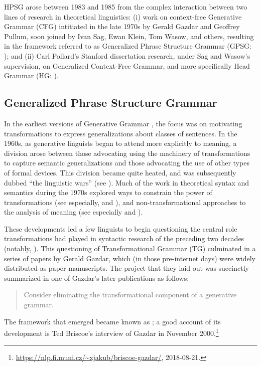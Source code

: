 \documentclass[output=paper]{langsci/langscibook}
\begin{document}
HPSG arose between 1983 and 1985 from the complex interaction between two lines of research in theoretical linguistics: (i) work on context-free Generative Grammar (CFG) intitiated in the late 1970s by Gerald Gazdar and Geoffrey Pullum, soon joined by Ivan Sag, Ewan Klein, Tom Wasow, and others, resulting in the framework referred to as Generalized Phrase Structure Grammar (GPSG: \citet*{GKPS85a}); and (ii) Carl Pollard's Stanford dissertation research, under Sag and Wasow's supervision, on Generalized Context-Free Grammar, and more specifically Head Grammar (HG: \citet{Pollard84a-u}).

\subsection{Generalized Phrase Structure Grammar}

In the earliest versions of Generative Grammar \citep{Chomsky57a}, the focus was on motivating transformations to express generalizations about classes of sentences.  In the 1960s, as generative linguists began to attend more explicitly to meaning, a division arose between those advocating using the machinery of transformations to capture semantic generalizations and those advocating the use of other types of formal devices.  This division became quite heated, and was subsequently dubbed ``the linguistic wars'' (see \citet[Chapter 5]{Newmeyer:1980}).  Much of the work in theoretical syntax and semantics during the 1970s explored ways to constrain the power of transformations (see especially, \citet{Chomsky73a} and \citet{ChomLas1977}), and non-transformational approaches to the analysis of meaning (see especially \citet{Montague74a-ed} and \citet{Dowty79a}).

These developments led a few linguists to begin questioning the central role transformations had played in syntactic research of the preceding two decades (notably, \citet{Bresnan78a}).  This questioning of Transformational Grammar (TG) culminated in a series of papers by Gerald Gazdar, which (in those pre-internet days) were widely distributed as paper manuscripts.  The project that they laid out was succinctly summarized in one of Gazdar's later publications as follows:

\begin{quote}
Consider eliminating the transformational component of a generative grammar. \citep[]{Gazdar81}
\end{quote}

\noindent
The framework that emerged became known as ; a good account of its development is Ted Briscoe's interview of Gazdar in November 2000.\footnote{\url{https://nlp.fi.muni.cz/~xjakub/briscoe-gazdar/}, 2018-08-21.}
\end{document}
